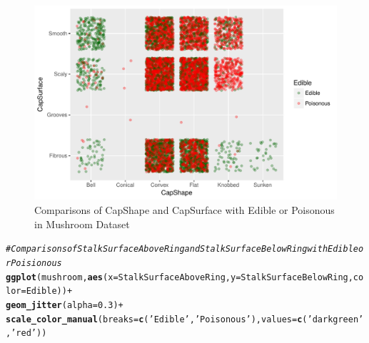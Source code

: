 \documentclass[10pt  ,usenames, dvipsnames]{article}\usepackage[]{graphicx}\usepackage[]{color}
\makeatletter
\newcommand{\hlnum}[1]{\textcolor[rgb]{0.686,0.059,0.569}{#1}}%
\newcommand{\hlstr}[1]{\textcolor[rgb]{0.192,0.494,0.8}{#1}}%
\newcommand{\hlcom}[1]{\textcolor[rgb]{0.678,0.584,0.686}{\textit{#1}}}%
\newcommand{\hlopt}[1]{\textcolor[rgb]{0,0,0}{#1}}%
\newcommand{\hlstd}[1]{\textcolor[rgb]{0.345,0.345,0.345}{#1}}%
\newcommand{\hlkwc}[1]{\textcolor[rgb]{0.333,0.667,0.333}{#1}}%
\newcommand{\hlkwd}[1]{\textcolor[rgb]{0.737,0.353,0.396}{\textbf{#1}}}%
\newenvironment{kframe}{%
 \def\at@end@of@kframe{}%
 \ifinner\ifhmode%
  \def\at@end@of@kframe{\end{minipage}}%
  \begin{minipage}{\columnwidth}%
 \fi\fi%
 \def\FrameCommand##1{\hskip\@totalleftmargin \hskip-\fboxsep
 \colorbox{shadecolor}{##1}\hskip-\fboxsep
     \hskip-\linewidth \hskip-\@totalleftmargin \hskip\columnwidth}%
 \MakeFramed {\advance\hsize-\width
   \@totalleftmargin\z@ \linewidth\hsize
   \@setminipage}}%
 {\par\unskip\endMakeFramed%
 \at@end@of@kframe}
\newenvironment{knitrout}{}{} %
\makeatother
\begin{document}
\begin{figure}[H]
\begin{center}
\begin{knitrout}
\color{fgcolor}
\includegraphics[width=.76\linewidth]{figure/unnamed-chunk-16-1} 

\end{knitrout}
\caption {Comparisons of CapShape and CapSurface with Edible or Poisonous in Mushroom Dataset}
\label{fig2}
\end {center}
\end {figure}

\begin{knitrout}
\color{fgcolor}\begin{kframe}
\begin{alltt}
\hlcom{#Comparisons of StalkSurfaceAboveRing and StalkSurfaceBelowRing with Edible or Poisionous}
\hlkwd{ggplot}\hlstd{(mushroom,}\hlkwd{aes}\hlstd{(}\hlkwc{x}\hlstd{=StalkSurfaceAboveRing,} \hlkwc{y}\hlstd{=StalkSurfaceBelowRing,} \hlkwc{color}\hlstd{=Edible))} \hlopt{+}
  \hlkwd{geom_jitter}\hlstd{(}\hlkwc{alpha}\hlstd{=}\hlnum{0.3}\hlstd{)} \hlopt{+}
  \hlkwd{scale_color_manual}\hlstd{(}\hlkwc{breaks} \hlstd{=} \hlkwd{c}\hlstd{(}\hlstr{'Edible'}\hlstd{,}\hlstr{'Poisonous'}\hlstd{),} \hlkwc{values}\hlstd{=}\hlkwd{c}\hlstd{(}\hlstr{'darkgreen'}\hlstd{,}\hlstr{'red'}\hlstd{))}
\end{alltt}
\end{kframe}
\end{knitrout}
\end{document}
